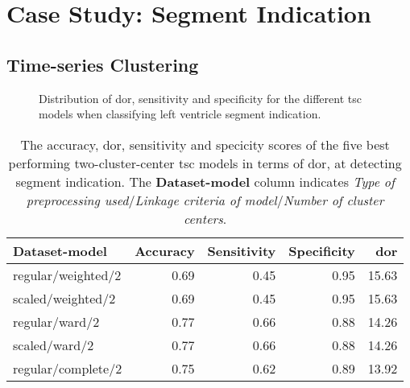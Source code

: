 \section{Case Study: Segment Indication}

\subsection{Time-series Clustering}

\begin{figure}[htb]
    \centering
    
    \caption{Distribution of \acrshort{dor}, sensitivity and specificity for the different \acrshort{tsc} models when classifying left ventricle segment indication.}
    \label{fig:tsc_segm_ind_dor_sens_spec_dist}
\end{figure}

\begin{table*}[htb]
    \centering
    \begin{tabular}{lrrrr}
        \toprule
        Dataset-model     &  Accuracy &  Sensitivity &  Specificity &  \acrshort{dor} \\
        \midrule
        regular/weighted/2 &      0.69 &         0.45 &         0.95 & 15.63 \\
        scaled/weighted/2  &      0.69 &         0.45 &         0.95 & 15.63 \\
        regular/ward/2     &      0.77 &         0.66 &         0.88 & 14.26 \\
        scaled/ward/2      &      0.77 &         0.66 &         0.88 & 14.26 \\
        regular/complete/2 &      0.75 &         0.62 &         0.89 & 13.92 \\
        \bottomrule
    \end{tabular}
    \caption{The accuracy, \acrshort{dor}, sensitivity and specicity scores of the five best performing two-cluster-center \acrshort{tsc} models in terms of \acrshort{dor}, at detecting segment indication.
             The \textbf{Dataset-model} column indicates \textit{Type of preprocessing used}$/$\textit{Linkage criteria of model}$/$\textit{Number of cluster centers}.}
    \label{tab:tsc_segm_ind_dor_sens_spec_dist}
\end{table*}


